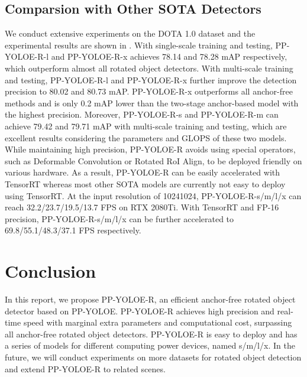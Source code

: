 \documentclass[final]{cvpr}
\begin{document}
\subsection{Comparsion with Other SOTA Detectors}
We conduct extensive experiments on the DOTA 1.0 dataset and the experimental results are shown in . With single-scale training and testing, PP-YOLOE-R-l and PP-YOLOE-R-x achieves 78.14 and 78.28 mAP respectively, which outperform almost all rotated object detectors. With multi-scale training and testing, PP-YOLOE-R-l and PP-YOLOE-R-x further improve the detection precision to 80.02 and 80.73 mAP. PP-YOLOE-R-x outperforms all anchor-free methods and is only 0.2 mAP lower than the two-stage anchor-based model with the highest precision. Moreover, PP-YOLOE-R-s and PP-YOLOE-R-m can achieve 79.42 and 79.71 mAP with multi-scale training and testing, which are excellent results considering the parameters and GLOPS of these two models. While maintaining high precision, PP-YOLOE-R avoids using special operators, such as Deformable Convolution or Rotated RoI Align, to be deployed friendly on various hardware. As a result, PP-YOLOE-R can be easily accelerated with TensorRT whereas most other SOTA models are currently not easy to deploy using TensorRT. At the input resolution of 10241024, PP-YOLOE-R-s/m/l/x can reach 32.2/23.7/19.5/13.7 FPS on RTX 2080Ti. With TensorRT and FP-16 precision, PP-YOLOE-R-s/m/l/x can be further accelerated to 69.8/55.1/48.3/37.1 FPS respectively.


\section{Conclusion}
In this report, we propose PP-YOLOE-R, an efficient anchor-free rotated object detector based on PP-YOLOE. PP-YOLOE-R achieves high precision and real-time speed with marginal extra parameters and computational cost, surpassing all anchor-free rotated object detectors. PP-YOLOE-R is easy to deploy and has a series of models for different computing power devices, named s/m/l/x. In the future, we will conduct experiments on more datasets for rotated object detection and extend PP-YOLOE-R to related scenes.



{\small


}
\end{document}
